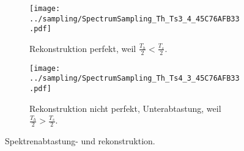 \begin{figure*}[h]
\centering
\begin{subfigure}{0.75\textwidth}
\texttt{[image: ../sampling/SpectrumSampling\_Th\_Ts3\_4\_45C76AFB33.pdf]}
\caption{Rekonstruktion perfekt, weil $\frac{T_h}{2}<\frac{T_s}{2}$.}
\label{fig:SpectrumSampling_Th_Ts3_4_45C76AFB33}
\end{subfigure}

\begin{subfigure}{0.75\textwidth}
\texttt{[image: ../sampling/SpectrumSampling\_Th\_Ts4\_3\_45C76AFB33.pdf]}
\caption{Rekonstruktion nicht perfekt, Unterabtastung, weil $\frac{T_h}{2}>\frac{T_s}{2}$.}
\label{fig:SpectrumSampling_Th_Ts4_3_45C76AFB33}
\end{subfigure}
\caption{Spektrenabtastung- und rekonstruktion.}
\label{fig:SpectrumSampling_Th_TsXX45C76AFB33}
\end{figure*}
